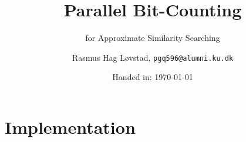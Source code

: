 \documentclass[12pt,usenames]{article}
\title{Parallel Bit-Counting} %
\subtitle{for Approximate Similarity Searching} %
\author{Rasmus Hag Løvstad, \texttt{pgq596@alumni.ku.dk}}%
\date{Handed in: \today}%
\begin{document}
\maketitle

\tableofcontents



\section{Implementation}





\setcounter{secnumdepth}{0}



\printbibliography
\end{document}
